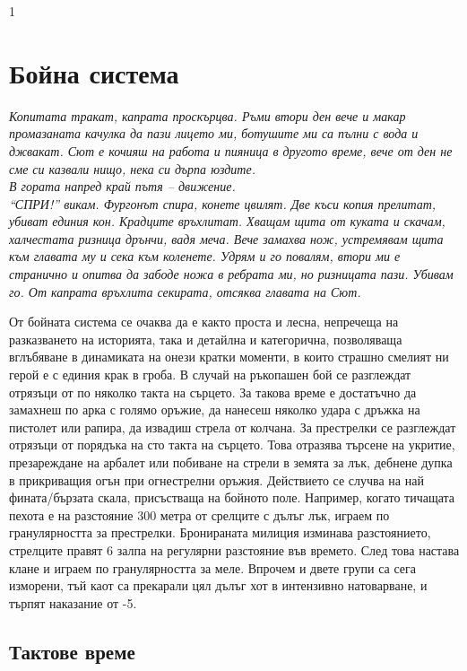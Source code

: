 1\section{Бойна система}
\emph{Копитата тракат, капрата проскърцва. Ръми втори ден вече и макар
промазаната качулка да пази лицето ми, ботушите ми са пълни с вода и джвакат.
Сют е кочияш на работа и пияница в другото време, вече от ден не сме си
казвали нищо, нека си дърпа юздите. \\
В гората напред край пътя – движение. \\
“СПРИ!” викам. Фургонът спира, конете цвилят. Две къси копия прелитат,
убиват единия кон. Крадците връхлитат. Хващам щита от куката и скачам,
халчестата ризница дрънчи, вадя меча. Вече замахва нож, устремявам щита
към главата му и сека към коленете. Удрям и го повалям, втори ми е странично
и опитва да забоде ножа в ребрата ми, но ризницата пази. Убивам го. От
капрата връхлита секирата, отсяква главата на Сют.}

\vspace{5mm} \indent
От бойната система се очаква да е както проста и лесна, непречеща на разказването на историята, така и детайлна и категорична, позволяваща вглъбяване в динамиката на онези кратки моменти, в които страшно смелият ни герой е с единия крак в гроба.
В случай на ръкопашен бой се разглеждат отрязъци от по няколко такта на сърцето. За такова време е достатъчно да замахнеш по арка с голямо оръжие, да нанесеш няколко удара с дръжка на пистолет или рапира, да извадиш стрела от колчана.
За престрелки се разглеждат отрязъци от порядъка на сто такта на сърцето. Това отразява търсене на укритие, презареждане на арбалет или побиване на стрели в земята за лък, дебнене дупка в прикриващия огън при огнестрелни оръжия.
Действието се случва на най фината/бързата скала, присъстваща на бойното поле.
Например, когато тичащата пехота е на разстояние 300 метра от срелците с дълъг лък, играем по гранулярността за престрелки.  Бронираната милиция изминава разстоянието, стрелците правят 6 залпа на регулярни разстояние във времето. След това настава клане и играем по гранулярността за меле. Впрочем и двете групи са сега изморени, тъй каот са прекарали цял дълъг хот в интензивно натоварване, и търпят наказание от -5.

\subsection{Тактове време}
